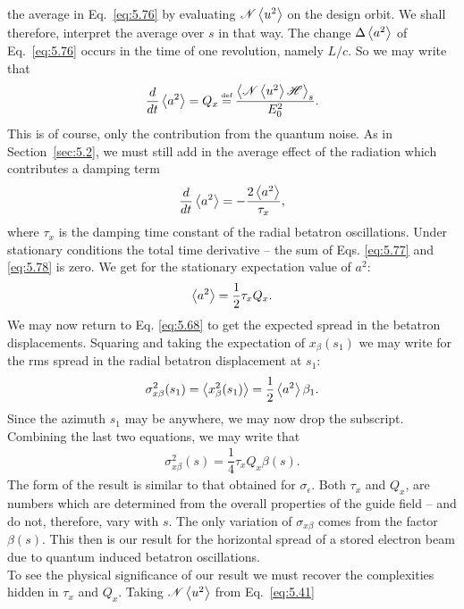  the average in Eq.~\eqref{eq:5.76} by evaluating $\mathscr{N}\left< u^2 \right>$ on the design orbit. We shall therefore, interpret the average over $s$ in that way.
The change $\Delta \left< a^2 \right>$ of Eq.~\eqref{eq:5.76} occurs in the time of one revolution, namely $L/c$. So we may write that
\begin{align} \label{eq:5.77}
	\dfrac{d}{dt} \mean{a^2} = Q_x \bydef \dfrac{\mean{\mathscr{N}\mean{u^2}\mathscr{H}}_s}{E_0^2}.
\end{align}
This is of course, only the contribution from the quantum noise. As in Section~\ref{sec:5.2}, we must still add in the average effect of the radiation which contributes a damping term
\begin{align} \label{eq:5.78}
	\dfrac{d}{dt} \left< a^2 \right> = - \dfrac{2 \left< a^2 \right>}{\tau_x},
\end{align}
where $\tau_x$ is the damping time constant of the radial betatron oscillations. Under stationary
 conditions the total time derivative -- the sum of Eqs. \eqref{eq:5.77} and \eqref{eq:5.78} is zero. We get for the stationary expectation value of $a^2$:
\begin{align}
	\left< a^2 \right> = \dfrac{1}{2} \tau_x Q_x.
\end{align}
We may now return to Eq. \eqref{eq:5.68} to get the expected spread in the betatron displacements. Squaring and taking the expectation of $x_\beta(s_1)$ we may write for the rms spread in the radial betatron displacement at $s_1$:
\begin{align} \label{eq:5.81}
	\sigma_{x \beta}^2(s_1) = \left< x_\beta^2(s_1) \right> = \dfrac{1}{2}\left< a^2 \right>\beta_1.
\end{align}
Since the azimuth $s_1$ may be anywhere, we may now drop the subscript. Combining the last two equations, we may write that
\begin{align}
	\sigma_{x \beta}^2(s) = \dfrac{1}{4} \tau_x Q_x \beta(s).
\end{align}
The form of the result is similar to that obtained for $\sigma_\epsilon$. Both $\tau_x$ and $Q_x$, are numbers which are determined from the overall properties of the guide field -- and do not, therefore, vary with $s$. The only variation of $\sigma_{x\beta}$ comes from the factor $\beta(s)$. This then is our result for the horizontal spread of a stored electron beam due to quantum induced betatron oscillations.\\
To see the physical significance of our result we must recover the complexities hidden in $\tau_x$ and $Q_x$. Taking $\mathscr{N}\left< u^2 \right>$ from Eq.~\eqref{eq:5.41}
